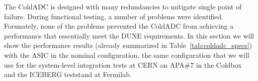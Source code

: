 \label{sec:4.}


The ColdADC is designed with many redundancies to mitigate single point of failure. During functional testing, a number of 
problems were identified. Forunately, none of the problems prevented the ColdADC from achieving a performance that 
essentially meet the DUNE requirements. In this section we will show the  performance results (already summarized 
in Table~\ref{tab:coldadc_specs}) with the ASIC in the nominal configuration, the same configuration that we will 
use for the system-level integration tests at CERN on APA\#7 in the Coldbox and the ICEBERG teststand at Fermilab.

